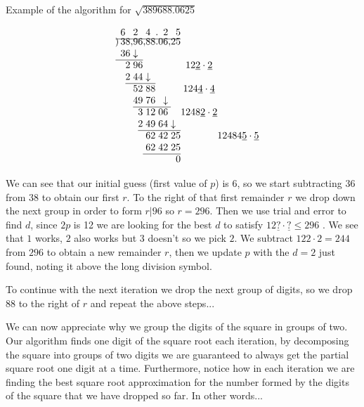 \documentclass{uofa_template}
\begin{document}
\begin{enumerate}
Example of the algorithm for $\sqrt{389688.0625}$

\[
\begin{array}{ r *{32}{c@{}} }
& 6 & & & 2 & & & 4 & & . & & 2 & && 5 \\ \cline{2-15}\\[-14.5pt]
\multicolumn{1}{r}{\rlap{\kern4.5pt)}} & 3 & 8 & , & 9 & 6 &, & 8 & 8 & . & 0 & 6 & , & 2 & 5 \\
& 3 & 6 && \downarrow \\ \cline{2-6}
& & 2 & & 9 & 6 &&&&&&&&&&&&&&&& 12\underline{2} \cdot \underline{2} \\
& & 2 & & 4 & 4 && \downarrow \\  \cline{3-9}
& & & & 5 & 2 & & 8 & 8 &&&&&&&&&&&&& 124\underline{4} \cdot \underline{4} \\
& & & & 4 & 9 & & 7 & 6 &&& \downarrow \\   \cline{5-13}
& & & & & 3 &  & 1 & 2 && 0 & 6 &&&&&&&&&& 1248\underline{2} \cdot \underline{2} \\
& & & & & 2 &  & 4 & 9 && 6 & 4 && \downarrow \\  \cline{6-17}
& & & & & & & 6 & 2 & & 4 & 2 && 2 & 5 &&&&&&&&&& 12484\underline{5} \cdot \underline{5} \\
& & & & & & & 6 & 2 & & 4 & 2 && 2 & 5 \\ \cline{7-16}
& & & & & & &  &  & &  &  &&  & 0
\end{array}
\]

We can see that our initial guess (first value of $p$) is 6, so we start subtracting $36$ from $38$ to obtain our first $r$. To the right of that first remainder $r$ we drop down the next group in order to form $r|96$ so $r = 296$. Then we use trial and error to find $d$, since $2p$ is 12 we are looking for the best $d$ to satisfy $12\underline{?} \cdot \underline{?} \leq 296$ . We see that $1$ works, $2$ also works but $3$ doesn't so we pick $2$. We subtract $122 \cdot 2 = 244$ from $296$ to obtain a new remainder $r$, then we update $p$ with the $d = 2$ just found, noting it above the long division symbol.

To continue with the next iteration we drop the next group of digits, so we drop $88$ to the right of $r$ and repeat the above steps...

We can now appreciate why we group the digits of the square in groups of two. Our algorithm finds one digit of the square root each iteration, by decomposing the square into groups of two digits we are guaranteed to always get the partial square root one digit at a time. Furthermore, notice how in each iteration we are finding the best square root approximation for the number formed by the digits of the square that we have dropped so far. In other words...


\end{enumerate}
\end{document}
